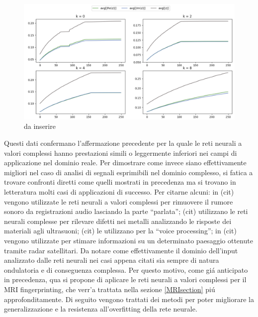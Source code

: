 \documentclass[a4paper,10pt]{article}
\begin{document}
 
 
 \begin{figure}[h!]
  \centering
  \includegraphics[scale=0.3]{WeightsAverage.png}
  \caption{da inserire}
  \label{WeightsAveragepng}
 \end{figure}
 
 Questi dati confermano l'affermazione precedente per la quale le reti neurali a valori complessi hanno prestazioni simili o leggermente inferiori nei campi di applicazione nel dominio reale. Per dimostrare come invece siano effettivamente migliori nel caso di analisi di segnali esprimibili nel dominio complesso, si fatica a trovare confronti diretti come quelli mostrati in precedenza ma si trovano in letteratura molti casi di applicazioni di successo. Per citarne alcuni: in (cit) vengono utilizzate le reti neurali a valori complessi per rimuovere il rumore sonoro da registrazioni audio lasciando la parte ``parlata''; (cit) utilizzano le reti neurali complesse per rilevare difetti nei metalli analizzando le risposte dei materiali agli ultrasuoni; (cit) le utilizzano per la ``voice processing''; in (cit) vengono utilizzate per stimare informazioni su un determinato paesaggio ottenute tramite radar satellitari. Da notare come effettivamente il dominio dell'input analizzato dalle reti neurali nei casi appena citati sia sempre di natura ondulatoria e di conseguenza complessa. Per questo motivo, come gi\'a anticipato in precedenza, qua si propone di aplicare le reti neurali a valori complessi per il MRI fingerprinting, che verr'a trattata nella sezione \ref{MRIsection} pi\'u approfonditamente. 
 Di seguito vengono trattati dei metodi per poter migliorare la generalizzazione e la resistenza all'overfitting della rete neurale.



 
\end{document}
